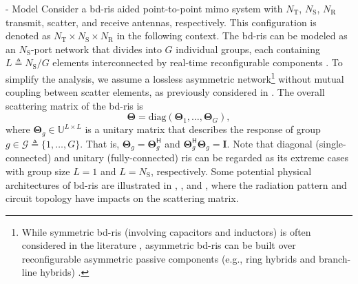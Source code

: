 \documentclass[journal]{IEEEtran}
\begin{document}
\begin{section}{- Model}
	Consider a \gls{bd}-\gls{ris} aided point-to-point \gls{mimo} system with $N_\mathrm{T}$, $N_\mathrm{S}$, $N_\mathrm{R}$ transmit, scatter, and receive antennas, respectively.
	This configuration is denoted as $N_\mathrm{T} \times N_\mathrm{S} \times N_\mathrm{R}$ in the following context.
	The \gls{bd}-\gls{ris} can be modeled as an $N_\mathrm{S}$-port network \cite{Ivrlac2010} that divides into $G$ individual groups, each containing $L \triangleq N_\mathrm{S} / G$ elements interconnected by real-time reconfigurable components \cite{Shen2020a}.
	To simplify the analysis, we assume a lossless asymmetric network\footnote{While symmetric \gls{bd}-\gls{ris} (involving capacitors and inductors) is often considered in the literature \cite{Shen2020a,Nerini2023,Santamaria2023,Fang2023,Nerini2024,Zhou2023,Li2023d,Bartoli2023}, asymmetric \gls{bd}-\gls{ris} can be built over reconfigurable asymmetric passive components (e.g., ring hybrids and branch-line hybrids) \cite{Ahn2006}.} without mutual coupling between scatter elements, as previously considered in \cite{Li2023b,Li2023c,Bartoli2023}.
	The overall scattering matrix of the \gls{bd}-\gls{ris} is
	\begin{equation}
		\mathbf{\Theta} = \mathrm{diag}(\mathbf{\Theta}_1,\ldots,\mathbf{\Theta}_G),
	\end{equation}
	where $\mathbf{\Theta}_g \in \mathbb{U}^{L \times L}$ is a unitary matrix that describes the response of group $g \in \mathcal{G} \triangleq \{1, \ldots, G\}$.
	That is, $\mathbf{\Theta}_g = \mathbf{\Theta}_g^\mathsf{H}$ and $\mathbf{\Theta}_g^\mathsf{H} \mathbf{\Theta}_g = \mathbf{I}$.
	Note that diagonal (single-connected) and unitary (fully-connected) \gls{ris} can be regarded as its extreme cases with group size $L=1$ and $L=N_\mathrm{S}$, respectively.
	Some potential physical architectures of \gls{bd}-\gls{ris} are illustrated in \cite[Fig. 3]{Shen2020a}, \cite[Fig. 5]{Li2023c}, and \cite[Fig. 2]{Nerini2024}, where the radiation pattern and circuit topology have impacts on the scattering matrix.


\end{section}
\end{document}
